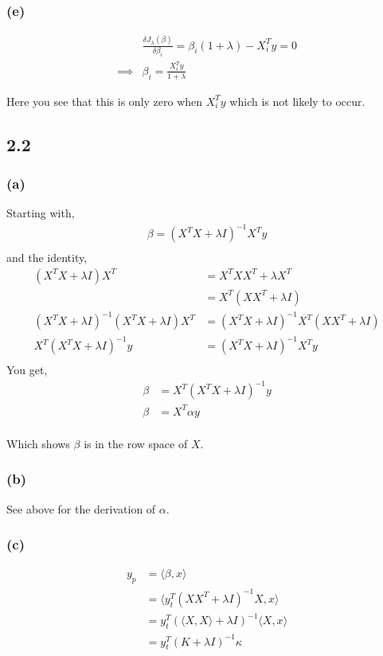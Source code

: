 \documentclass[letterpaper,10pt]{article} %
\newcommand{\lm}{\lambda}
\newcommand{\difrac}[2]{\frac{\delta #1}{\delta #2}}
\begin{document}
\subsubsection*{(e)}
\begin{align*}
&\difrac{J_{\lm}(\beta)}{\beta_i} = \beta_i(1+\lm) - X_i^T y = 0\\
\implies&\beta_i = \frac{X_i^Ty}{1+\lm}
\end{align*}

Here you see that this is only zero when $X_i^Ty$ which is not likely to occur.
\subsection{2.2}
\subsubsection*{(a)}
Starting with,
\begin{align*}
\beta =(X^TX+\lm I)^{-1}X^Ty\\
\end{align*}
and the identity,
\begin{align*}
(X^TX+\lm I)X^T &= X^TXX^T+\lm X^T \\
                &= X^T(XX^T+\lm I)\\
(X^TX+\lm I)^{-1}(X^TX+\lm I)X^T &= (X^TX+\lm I)^{-1}X^T(XX^T+\lm I)\\
X^T(X^TX+\lm I)^{-1}y &= (X^TX+\lm I)^{-1}X^Ty\\
\end{align*}
You get,
\begin{align*}
\beta &= X^T(X^TX+\lm I)^{-1}y\\
\beta &= X^T\alpha y\\
\end{align*}

Which shows $\beta$ is in the row space of $X$. 
\subsubsection*{(b)}
See above for the derivation of $\alpha$.
\subsubsection*{(c)}
\begin{align*}
y_{p} &= \langle \beta, x \rangle\\
  &=\langle y_{t}^T(XX^T+\lm I)^{-1}X, x \rangle\\
  &=y_{t}^T(\langle X,X \rangle+\lm I)^{-1}\langle X, x \rangle\\
  &=y_{t}^T(K+\lm I)^{-1}\kappa
\end{align*}
\end{document}

